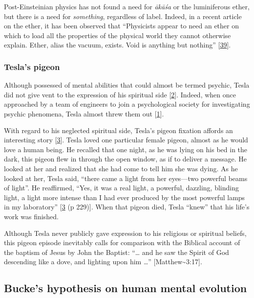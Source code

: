 \documentclass[
  a4paper,
]{article}
\begin{document}
Post-Einsteinian physics has not found a need for \emph{ākāśa} or the
luminiferous ether, but there is a need for \emph{something}, regardless
of label. Indeed, in a recent article on the ether, it has been observed
that ``Physicists appear to need an ether on which to load all the
properties of the physical world they cannot otherwise explain. Ether,
alias the vacuum, exists. Void is anything but nothing''
{[}\protect\hyperlink{ref-heil03}{39}{]}.

\hypertarget{teslas-pigeon}{%
\subsubsection{Tesla's pigeon}\label{teslas-pigeon}}

Although possessed of mental abilities that could almost be termed
psychic, Tesla did not give vent to the expression of his spiritual side
{[}\protect\hyperlink{ref-oneill80}{2}{]}. Indeed, when once approached
by a team of engineers to join a psychological society for investigating
psychic phenomena, Tesla almost threw them out
{[}\protect\hyperlink{ref-john83}{1}{]}.

With regard to his neglected spiritual side, Tesla's pigeon fixation
affords an interesting story {[}\protect\hyperlink{ref-cheney81}{3}{]}.
Tesla loved one particular female pigeon, almost as he would love a
human being. He recalled that one night, as he was lying on his bed in
the dark, this pigeon flew in through the open window, as if to deliver
a message. He looked at her and realized that she had come to tell him
she was dying. As he looked at her, Tesla said, ``there came a light
from her eyes---two powerful beams of light''. He reaffirmed, ``Yes, it
was a real light, a powerful, dazzling, blinding light, a light more
intense than I had ever produced by the most powerful lamps in my
laboratory'' {[}\protect\hyperlink{ref-cheney81}{3} (p 229){]}. When
that pigeon died, Tesla ``knew'' that his life's work was finished.

Although Tesla never publicly gave expression to his religious or
spiritual beliefs, this pigeon episode inevitably calls for comparison
with the Biblical account of the baptism of Jesus by John the Baptist:
``\ldots{} and he saw the Spirit of God descending like a dove, and
lighting upon him \ldots{}'' {[}Matthew\textasciitilde3:17{]}.

\hypertarget{buckes-hypothesis-on-human-mental-evolution}{%
\subsection{Bucke's hypothesis on human mental
evolution}\label{buckes-hypothesis-on-human-mental-evolution}}
\end{document}
